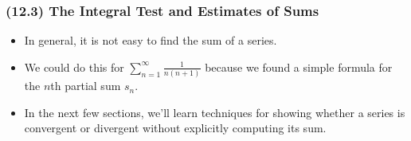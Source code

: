 \begin{frame}\frametitle{(12.3) The Integral Test and Estimates of Sums}
\begin{itemize}
\item  In general, it is not easy to find the sum of a series.
\item  We could do this for $\displaystyle \sum_{n=1}^\infty \frac{1}{n(n+1)}$ because we found a simple formula for the $n$th partial sum $s_n$.
\item  In the next few sections, we'll learn techniques for showing whether a series is convergent or divergent without explicitly computing its sum.
\end{itemize}
\end{frame}
